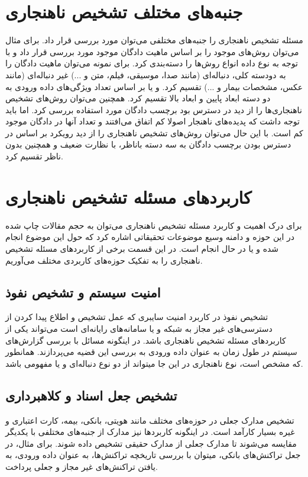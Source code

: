 \documentclass[12pt,a4paper]{report}
\theoremstyle{definition}
\theoremstyle{definition}
\begin{document}
\section{جنبه‌های مختلف تشخیص ناهنجاری}
مسئله تشخیص ناهنجاری را جنبه‌های مختلفی می‌توان مورد بررسی قرار داد. برای مثال می‌توان روش‌های موجود را بر اساس ماهیت دادگان موجود مورد بررسی قرار داد و با توجه به نوع داده انواع روش‌ها را دسته‌بندی کرد. برای نمونه می‌توان ماهیت دادگان را به دودسته کلی، دنباله‌ای (مانند صدا، موسیقی، فیلم، متن و ...) غیر دنباله‌ای (مانند عکس، مشخصات بیمار و ...) تقسیم کرد. و یا بر اساس تعداد ویژگی‌های داده ورودی به دو دسته ابعاد پایین و ابعاد بالا تقسیم کرد. همچنین می‌توان روش‌های تشخیص ناهنجاری‌ها را از دید در دسترس بود برچسب دادگان مورد استفاده بررسی کرد. اما باید توجه داشت که پدیده‌های ناهنجار اصولا کم اتفاق می‌افتند و تعداد آنها در دادگان موجود کم است. با این حال می‌توان روش‌های تشخیص ناهنجاری را از دید رویکرد بر اساس در دسترس بودن برچسب دادگان به سه دسته باناظر، با نظارت ضعیف و همچنین بدون ناظر تقسیم کرد.

\section {کاربرد‌های مسئله تشخیص ناهنجاری}
برای درک اهمیت و کاربرد مسئله تشخیص ناهنجاری می‌توان به حجم مقالات چاپ شده در این حوزه و دامنه وسیع موضوعات تحقیقاتی اشاره کرد که حول این موضوع انجام شده و یا در حال انجام است. در این قسمت برخی از کاربرد‌های مسئله تشخیص ناهنجاری را به تفکیک حوزه‌های کاربردی مختلف می‌آوریم.

\subsection{امنیت سیستم و تشخیص نفوذ}
تشخیص نفوذ در کاربرد امنیت سایبری که عمل تشخیص و اطلاع پیدا کردن از دسترسی‌های غیر مجاز به شبکه و یا سامانه‌های رایانه‌ای است می‌تواند یکی از کاربرد‌های مسئله تشخیص ناهنجاری باشد. در اینگونه مسائل با بررسی گزارش‌های سیستم در طول زمان به عنوان داده ورودی به بررسی این قضیه می‌پردازند. همانطور که مشخص است، نوع  ناهنجاری در این جا میتواند از دو نوع دنباله‌ای و یا مفهومی باشد.

\subsection{تشخیص جعل اسناد و کلاهبرداری}
تشخیص مدارک جعلی در حوزه‌های مختلف مانند هویتی، بانکی، بیمه، کارت اعتباری و غیره بسیار کارآمد است. در اینگونه کاربردها نیز مدارک از جنبه‌های مختلفی با یکدیگر مقایسه می‌شوند تا مدارک جعلی از مدارک حقیقی تشخیص داده شوند. برای مثال، در جعل تراکنش‌های بانکی، میتوان با بررسی تاریخچه تراکنش‌ها، به عنوان داده ورودی، به یافتن تراکنش‌های غیر مجاز و جعلی پرداخت.
\end{document}
